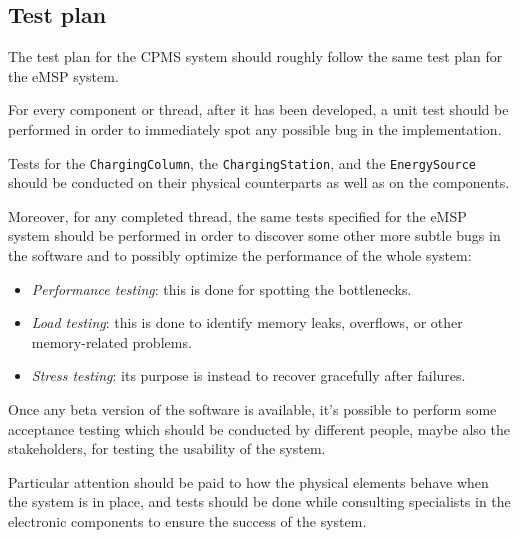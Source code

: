 \subsection{Test plan}

The test plan for the CPMS system should roughly follow the same test plan for the eMSP system. \medskip

For every component or thread, after it has been developed, a unit test should be performed in order to immediately spot any possible bug in the implementation.\medskip

Tests for the \texttt{ChargingColumn}, the \texttt{ChargingStation}, and the \texttt{EnergySource} should be conducted on their physical counterparts as well as on the components.

Moreover, for any completed thread, the same tests specified for the eMSP system should be performed in order to discover some other more subtle bugs in the software and to possibly optimize the performance of the whole system:
\begin{itemize}
    \item \textit{Performance testing}: this is done for spotting the bottlenecks.
    \item \textit{Load testing}: this is done to identify memory leaks, overflows, or other memory-related problems.
    \item \textit{Stress testing}: its purpose is instead to recover gracefully after failures.
\end{itemize}

Once any beta version of the software is available, it's possible to perform some acceptance testing which should be conducted by different people, maybe also the stakeholders, for testing the usability of the system.

Particular attention should be paid to how the physical elements behave when the system is in place, and tests should be done while consulting specialists in the electronic components to ensure the success of the system.